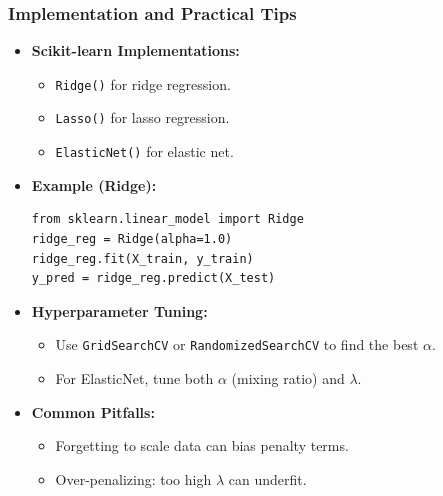 \documentclass[aspectratio=169]{beamer}
\begin{document}
\begin{frame}[fragile]
    \frametitle{Implementation and Practical Tips}
    \begin{itemize}
        \item \textbf{Scikit-learn Implementations:}
            \begin{itemize}
                \item \texttt{Ridge()} for ridge regression.
                \item \texttt{Lasso()} for lasso regression.
                \item \texttt{ElasticNet()} for elastic net.
            \end{itemize}
        \item \textbf{Example (Ridge):}
\begin{verbatim}
from sklearn.linear_model import Ridge
ridge_reg = Ridge(alpha=1.0)
ridge_reg.fit(X_train, y_train)
y_pred = ridge_reg.predict(X_test)
\end{verbatim}
        \item \textbf{Hyperparameter Tuning:}
            \begin{itemize}
                \item Use \texttt{GridSearchCV} or \texttt{RandomizedSearchCV} to find the best \(\alpha\).
                \item For ElasticNet, tune both \(\alpha\) (mixing ratio) and \(\lambda\).
            \end{itemize}
        \item \textbf{Common Pitfalls:}
            \begin{itemize}
                \item Forgetting to scale data can bias penalty terms.
                \item Over-penalizing: too high \(\lambda\) can underfit.
            \end{itemize}
    \end{itemize}
\end{frame}
\end{document}
